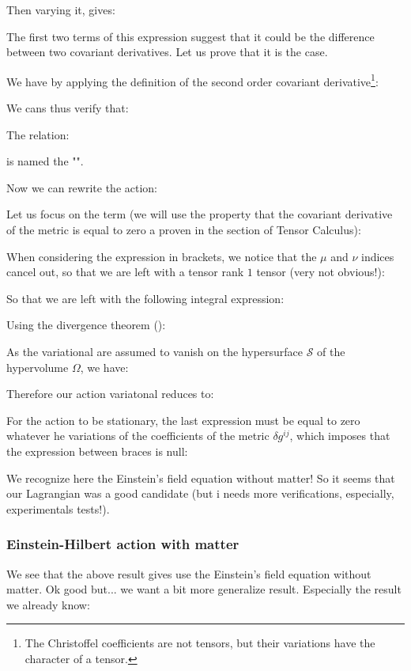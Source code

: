 \begin{itemize}
	Then varying it, gives:
	
	The first two terms of this expression suggest that it could be the difference between two covariant derivatives. Let us prove that it is the case.
	
	We have by applying the definition of the second order covariant derivative\footnote{The Christoffel coefficients are not tensors, but their variations have the character of a tensor.}:
	
	We cans thus verify that:
	
	The relation:
	
	is named the "".
	\end{itemize}
	Now we can rewrite the action:
	
	Let us focus on the term (we will use the property that the covariant derivative of the metric is equal to zero a proven in the section of Tensor Calculus):
	
	When considering the expression in brackets, we notice that the $\mu$ and $\nu$ indices cancel out, so that we are left with a tensor rank $1$ tensor (very not obvious!):
	
	So that we are left with the following integral expression:
	
	Using the divergence theorem ():
	
	As the variational are assumed to vanish on the hypersurface $\mathcal{S}$ of the hypervolume $\Omega$, we have:
	
	Therefore our action variatonal reduces to:
	
	For the action to be stationary, the last expression must be equal to zero whatever he variations of the coefficients of the metric $\delta g^{ij}$, which imposes that the expression between braces is null:
	
	We recognize here the Einstein's field equation without matter! So it seems that our Lagrangian was a good candidate (but i needs more verifications, especially, experimentals tests!).
	
	\subsubsection{Einstein-Hilbert action with matter}
	We see that the above result gives use the Einstein's field equation without matter. Ok good but... we want a bit more generalize result. Especially the result we already know:
	
